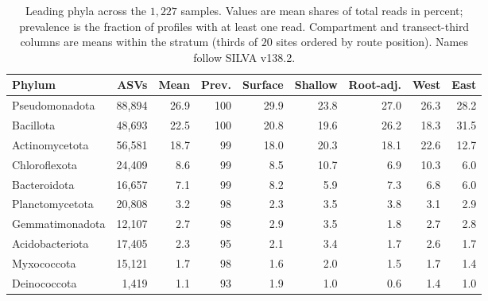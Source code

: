 \begin{table}[htbp]
\centering\footnotesize
\caption{Leading phyla across the $1{,}227$ samples. Values are mean shares of total reads in percent; prevalence is the fraction of profiles with at least one read. Compartment and transect-third columns are means within the stratum (thirds of $20$ sites ordered by route position). Names follow SILVA v138.2.}
\label{tab:taxa_phyla}
\begin{tabular}{lrrrrrrrr}
\toprule
Phylum & ASVs & Mean & Prev. & Surface & Shallow & Root-adj. & West & East \\
\midrule
Pseudomonadota & 88,894 & 26.9 & 100 & 29.9 & 23.8 & 27.0 & 26.3 & 28.2 \\
Bacillota & 48,693 & 22.5 & 100 & 20.8 & 19.6 & 26.2 & 18.3 & 31.5 \\
Actinomycetota & 56,581 & 18.7 & 99 & 18.0 & 20.3 & 18.1 & 22.6 & 12.7 \\
Chloroflexota & 24,409 & 8.6 & 99 & 8.5 & 10.7 & 6.9 & 10.3 & 6.0 \\
Bacteroidota & 16,657 & 7.1 & 99 & 8.2 & 5.9 & 7.3 & 6.8 & 6.0 \\
Planctomycetota & 20,808 & 3.2 & 98 & 2.3 & 3.5 & 3.8 & 3.1 & 2.9 \\
Gemmatimonadota & 12,107 & 2.7 & 98 & 2.9 & 3.5 & 1.8 & 2.7 & 2.8 \\
Acidobacteriota & 17,405 & 2.3 & 95 & 2.1 & 3.4 & 1.7 & 2.6 & 1.7 \\
Myxococcota & 15,121 & 1.7 & 98 & 1.6 & 2.0 & 1.5 & 1.7 & 1.4 \\
Deinococcota & 1,419 & 1.1 & 93 & 1.9 & 1.0 & 0.6 & 1.4 & 1.0 \\
\bottomrule
\end{tabular}
\end{table}

